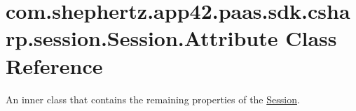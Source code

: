 \hypertarget{classcom_1_1shephertz_1_1app42_1_1paas_1_1sdk_1_1csharp_1_1session_1_1_session_1_1_attribute}{\section{com.\+shephertz.\+app42.\+paas.\+sdk.\+csharp.\+session.\+Session.\+Attribute Class Reference}
\label{classcom_1_1shephertz_1_1app42_1_1paas_1_1sdk_1_1csharp_1_1session_1_1_session_1_1_attribute}
}


An inner class that contains the remaining properties of the \hyperlink{classcom_1_1shephertz_1_1app42_1_1paas_1_1sdk_1_1csharp_1_1session_1_1_session}{Session}.  


